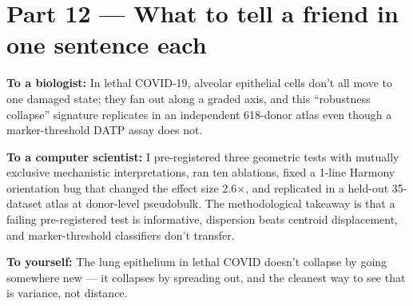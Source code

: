 \documentclass[11pt]{article}
\begin{document}
\section{Part 12 --- What to tell a friend in one sentence each}

\textbf{To a biologist:} In lethal COVID-19, alveolar epithelial cells don't
all move to one damaged state; they fan out along a graded axis, and this
``robustness collapse'' signature replicates in an independent 618-donor
atlas even though a marker-threshold DATP assay does not.

\textbf{To a computer scientist:} I pre-registered three geometric tests with
mutually exclusive mechanistic interpretations, ran ten ablations, fixed a
1-line Harmony orientation bug that changed the effect size 2.6$\times$, and
replicated in a held-out 35-dataset atlas at donor-level pseudobulk. The
methodological takeaway is that a failing pre-registered test is informative,
dispersion beats centroid displacement, and marker-threshold classifiers
don't transfer.

\textbf{To yourself:} The lung epithelium in lethal COVID doesn't collapse by
going somewhere new --- it collapses by spreading out, and the cleanest way
to see that is variance, not distance.
\end{document}
